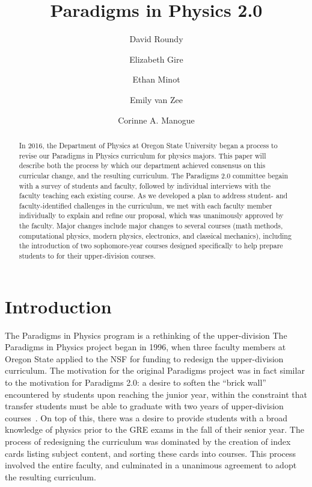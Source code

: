 \documentclass[english,aps,pra,reprint,noshowpacs,superscriptaddress]{revtex4-1}
\begin{document}
\title{Paradigms in Physics 2.0}
\author{David Roundy}
\author{Elizabeth Gire}
\author{Ethan Minot}
\author{Emily van Zee}
\author{Corinne A. Manogue}


\begin{abstract}
In 2016, the Department of Physics at Oregon State University began a
process to revise our Paradigms in Physics curriculum for physics
majors.  This paper will describe both the process by which our
department achieved consensus on this curricular change, and the
resulting curriculum.  The Paradigms 2.0 committee begain with a
survey of students and faculty, followed by individual interviews with
the faculty teaching each existing course.  As we developed a plan to
address student- and faculty-identified challenges in the curriculum,
we met with each faculty member individually to explain and refine our
proposal, which was unanimously approved by the faculty.  Major
changes include major changes to several courses (math
methods, computational physics, modern physics, electronics, and
classical mechanics), including the introduction of two sophomore-year
courses designed specifically to help prepare students to for their
upper-division courses.
\end{abstract}

\maketitle
%
\section{Introduction}
The Paradigms in Physics program is a rethinking of the upper-division
The Paradigms in Physics project began in 1996, when three faculty
members at Oregon State applied to the NSF for funding to redesign the
upper-division curriculum.  The motivation for the original Paradigms
project was in fact similar to the motivation for Paradigms 2.0: a
desire to soften the ``brick wall'' encountered by students upon
reaching the junior year, within the constraint that transfer students
must be able to graduate with two years of upper-division
courses~\cite{manogue2001paradigms}.  On top of this, there was a
desire to provide students with a broad knowledge of physics prior to
the GRE exams in the fall of their senior year.  The process of
redesigning the curriculum was dominated by the creation of index cards
listing subject content, and sorting these cards into courses.  This
process involved the entire faculty, and culminated in a unanimous
agreement to adopt the resulting curriculum.
\end{document}
